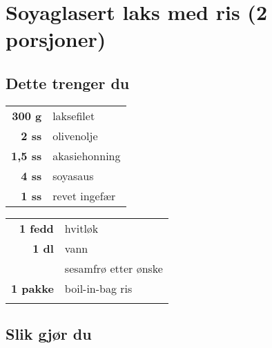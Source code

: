 \section*{Soyaglasert laks med ris (2 porsjoner)}

\subsection*{Dette trenger du}


\begin{table}[!htbp]
    \begin{tabular}{rl}
        \textbf{300 g}      & laksefilet            \\
        \textbf{2 ss}       & olivenolje            \\
        \textbf{1,5 ss}     & akasiehonning         \\
        \textbf{4 ss}       & soyasaus              \\
        \textbf{1 ss}       & revet ingefær         \\
    \end{tabular}
    \qquad
    \begin{tabular}{rl}
        \textbf{1 fedd}     & hvitløk               \\
        \textbf{1 dl}       & vann                  \\
                            & sesamfrø etter ønske  \\
        \textbf{1 pakke}    & boil-in-bag ris       \\
        & 
    \end{tabular}
\end{table}

\subsection*{Slik gjør du}

